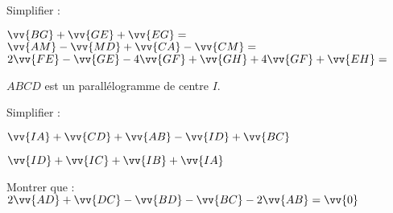 \documentclass[a4paper,addpoints,12pt]{exam}
\begin{document}
\begin{exo}[3]
\begin{questions}
\question[3] Simplifier :

\(\vv{BG}+\vv{GE}+\vv{EG}= \)\anserline[2]
\(\vv{AM}-\vv{MD}+\vv{CA}-\vv{CM}= \)\anserline[2]
\(2\vv{FE}-\vv{GE}-4\vv{GF}+\vv{GH}+4\vv{GF}+\vv{EH}= \)\anserline[2]
\end{questions}
\end{exo}

\begin{exo}[3]
$ABCD$ est un parallélogramme de centre $I$.
\begin{questions}
\question[2] Simplifier :
\begin{multicols}{2}
$\vv{IA}+\vv{CD}+\vv{AB}-\vv{ID}+\vv{BC}$

\anserline[5]
\columnbreak

$\vv{ID}+\vv{IC}+\vv{IB}+\vv{IA}$

\anserline[5]
\end{multicols}
\question[1] Montrer que : $2\vv{AD}+\vv{DC}-\vv{BD}-\vv{BC}-2\vv{AB}=\vv{0}$

\anserline[10]
\end{questions}
\end{exo}
\end{document}
